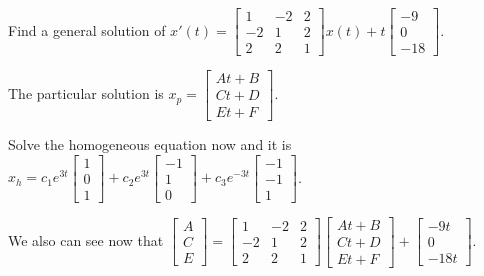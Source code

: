 \documentclass[../diffeq.tex]{subfiles}
\begin{document}
\begin{example}
    Find a general solution of $x'(t)=\begin{bmatrix}
        1 & -2 & 2 \\
        -2 & 1 & 2 \\
        2 & 2 & 1
    \end{bmatrix}x(t)+t\begin{bmatrix}
        -9\\0\\-18
    \end{bmatrix}$.

    The particular solution is $x_p=\begin{bmatrix}
        At+B\\
        Ct+D\\
        Et+F
    \end{bmatrix}$.

    Solve the homogeneous equation now and it is $x_h=c_1e^{3t}\begin{bmatrix}
        1\\0\\1
    \end{bmatrix}+c_2e^{3t}\begin{bmatrix}
        -1\\1\\0
    \end{bmatrix}+c_3e^{-3t}\begin{bmatrix}
        -1\\-1\\1
    \end{bmatrix}$.

    We also can see now that $\begin{bmatrix}
        A\\C\\E
    \end{bmatrix}=\begin{bmatrix}
        1 & -2 & 2 \\
        -2 & 1 & 2\\
        2 & 2 & 1
    \end{bmatrix}\begin{bmatrix}
        At+B\\Ct+D\\Et+F
    \end{bmatrix}+\begin{bmatrix}
        -9t\\0\\-18t
    \end{bmatrix}$.


\end{example}
\end{document}
